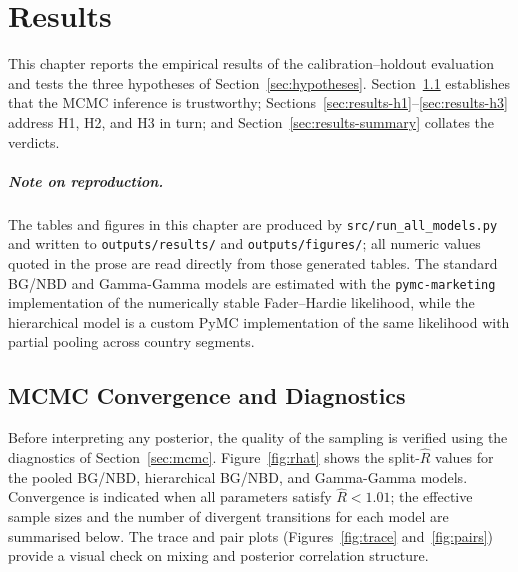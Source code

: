 \chapter{Results}
\label{ch:results}

This chapter reports the empirical results of the calibration--holdout evaluation and tests the three hypotheses of Section~\ref{sec:hypotheses}. Section~\ref{sec:results-diagnostics} establishes that the MCMC inference is trustworthy; Sections~\ref{sec:results-h1}--\ref{sec:results-h3} address H1, H2, and H3 in turn; and Section~\ref{sec:results-summary} collates the verdicts.

\paragraph{Note on reproduction.}
The tables and figures in this chapter are produced by \texttt{src/\allowbreak run\_all\_models.py} and written to \texttt{outputs/\allowbreak results/} and \texttt{outputs/\allowbreak figures/}; all numeric values quoted in the prose are read directly from those generated tables. The standard BG/NBD and Gamma-Gamma models are estimated with the \texttt{pymc-marketing} implementation of the numerically stable Fader--Hardie likelihood, while the hierarchical model is a custom PyMC implementation of the same likelihood with partial pooling across country segments.

\section{MCMC Convergence and Diagnostics}
\label{sec:results-diagnostics}

Before interpreting any posterior, the quality of the sampling is verified using the diagnostics of Section~\ref{sec:mcmc}. Figure~\ref{fig:rhat} shows the split-$\widehat{R}$ values for the pooled BG/NBD, hierarchical BG/NBD, and Gamma-Gamma models. Convergence is indicated when all parameters satisfy $\widehat{R} < 1.01$; the effective sample sizes and the number of divergent transitions for each model are summarised below. The trace and pair plots (Figures~\ref{fig:trace} and~\ref{fig:pairs}) provide a visual check on mixing and posterior correlation structure.



